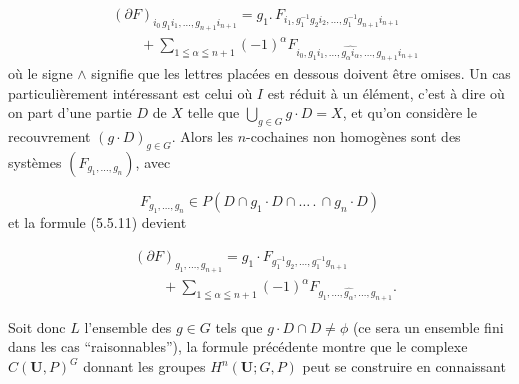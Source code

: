 \[
\tag{5.5.11}
\begin{aligned}
&(\partial F)_{i_0\,g_1i_1,\ldots,g_{n+1}i_{n+1}}
=g_1.\,F_{i_1,g_1^{-1}g_2i_2,\ldots,
g_1^{-1}g_{n+1}i_{n+1}}\\
&\qquad+\sum_{1\leqq\alpha\leqq n+1}(-1)^\alpha
F_{i_0,g_1i_1,\ldots,\widehat{g_\alpha i_\alpha},\ldots,
g_{n+1}i_{n+1}}
\end{aligned}
\]
où le signe $\wedge$ signifie que les lettres
placées en dessous doivent être omises.
Un cas particulièrement intéressant est celui où $I$ est réduit à un élément,
c'est à dire où on part d'une partie $D$ de $X$ telle que
$\displaystyle\bigcup_{g\in G}g\cdot D=X$, et qu'on considère le recouvrement
$(g\cdot D)_{g\in G}$. Alors les $n$-cochaines non homogènes sont des systèmes
$(F_{g_1,\ldots,g_n})$, avec

\[
F_{g_1,\ldots,g_n}\in
P(D\cap g_1\cdot D\cap\ldots\,.\,\cap g_n\cdot D)
\]
et la formule (5.5.11) devient

\[
\tag{5.5.11 bis}
\begin{aligned}
&(\partial F)_{g_1,\ldots,g_{n+1}}
=g_1\cdot F_{g_1^{-1}g_2,\ldots,g_1^{-1}g_{n+1}}\\
&\qquad+\sum_{1\leqq\alpha\leqq n+1}(-1)^\alpha
F_{g_1,\ldots,\widehat{g_\alpha},\ldots,g_{n+1}}.
\end{aligned}
\]

Soit donc $L$ l'ensemble des $g\in G$ tels que $g\cdot D\cap D\ne\phi$ (ce
sera un ensemble fini dans les cas ``raisonnables''), la formule précédente
montre que le complexe $C({\mathbf U},P)^G$ donnant les groupes
$H^n({\mathbf U};G,P)$ peut se construire en connaissant

